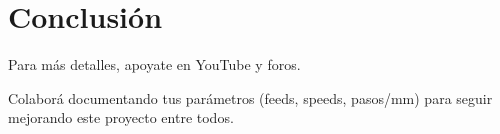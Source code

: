 \chapter{Conclusión}
\label{ch:conclusion}
Para más detalles, apoyate en YouTube y foros.  
\begin{tipbox}
Colaborá documentando tus parámetros (feeds, speeds, pasos/mm) para seguir mejorando este proyecto entre todos.
\end{tipbox}

